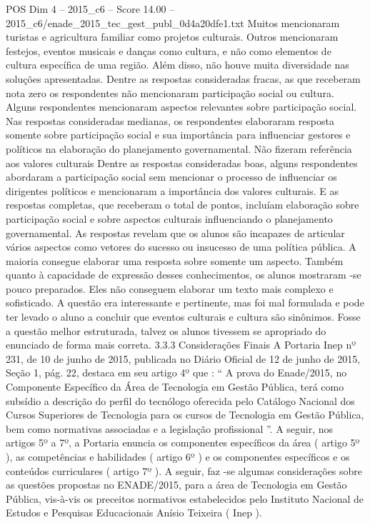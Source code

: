 \begin{textsample}{POS Dim 4 – 2015\_c6 – Score 14.00 – 2015\_c6/enade\_2015\_tec\_gest\_publ\_0d4a20dfe1.txt}
Muitos mencionaram turistas e agricultura familiar como projetos culturais.
Outros mencionaram festejos, eventos musicais e danças como cultura, e não como elementos de cultura específica de uma região.
Além disso, não houve muita diversidade nas soluções apresentadas.
Dentre as respostas consideradas fracas, as que receberam nota zero os respondentes não mencionaram participação social ou cultura.
Alguns respondentes mencionaram aspectos relevantes sobre participação social.
Nas respostas consideradas medianas, os respondentes elaboraram resposta somente sobre participação social e sua importância para influenciar gestores e políticos na elaboração do planejamento governamental.
Não fizeram referência aos valores culturais Dentre as respostas consideradas boas, alguns respondentes abordaram a participação social sem mencionar o processo de influenciar os dirigentes políticos e mencionaram a importância dos valores culturais.
E as respostas completas, que receberam o total de pontos, incluíam elaboração sobre participação social e sobre aspectos culturais influenciando o planejamento governamental.
As respostas revelam que os alunos são incapazes de articular vários aspectos como vetores do sucesso ou insucesso de uma política pública.
A maioria consegue elaborar uma resposta sobre somente um aspecto.
Também quanto à capacidade de expressão desses conhecimentos, os alunos mostraram -se pouco preparados.
Eles não conseguem elaborar um texto mais complexo e sofisticado.
A questão era interessante e pertinente, mas foi mal formulada e pode ter levado o aluno a concluir que eventos culturais e cultura são sinônimos.
Fosse a questão melhor estruturada, talvez os alunos tivessem se apropriado do enunciado de forma mais correta. 3.3.3 Considerações Finais A Portaria Inep nº 231, de 10 de junho de 2015, publicada no Diário Oficial de 12 de junho de 2015, Seção 1, pág. 22, destaca em seu artigo 4º que : “ A prova do Enade/2015, no Componente Específico da Área de Tecnologia em Gestão Pública, terá como subsídio a descrição do perfil do tecnólogo oferecida pelo Catálogo Nacional dos Cursos Superiores de Tecnologia para os cursos de Tecnologia em Gestão Pública, bem como normativas associadas e a legislação profissional ”.
A seguir, nos artigos 5º a 7º, a Portaria enuncia os componentes específicos da área ( artigo 5º ), as competências e habilidades ( artigo 6º ) e os componentes específicos e os conteúdos curriculares ( artigo 7º ).
A seguir, faz -se algumas considerações sobre as questões propostas no ENADE/2015, para a área de Tecnologia em Gestão Pública, vis-à-vis os preceitos normativos estabelecidos pelo Instituto Nacional de Estudos e Pesquisas Educacionais Anísio Teixeira ( Inep ).

\end{textsample}
